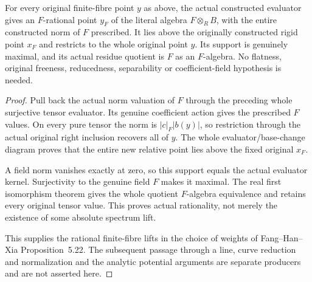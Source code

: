 \begin{theorem}
\label{spectrum:finite-rational-rigid-fibre-lift}
\leanok
{}
For every original finite-fibre point $y$ as above, the actual constructed
evaluator gives an $F$-rational point $y_F$ of the literal algebra
$F\otimes_RB$, with the entire constructed norm of $F$ prescribed.
It lies above the originally constructed rigid point $x_F$ and restricts
to the whole original point $y$. Its support is genuinely maximal, and
its actual residue quotient is $F$ as an $F$-algebra. No flatness, original
freeness, reducedness, separability or coefficient-field hypothesis is
needed.
\end{theorem}
\begin{proof}
Pull back the actual norm valuation of $F$ through the preceding whole
surjective tensor evaluator. Its genuine coefficient action gives the
prescribed $F$ values. On every pure tensor the norm is
$|c|_F|b(y)|$, so restriction through the actual original right inclusion
recovers all of $y$. The whole evaluator/base-change diagram proves
that the entire new relative point lies above the fixed original $x_F$.

A field norm vanishes exactly at zero, so this support equals the actual
evaluator kernel. Surjectivity to the genuine field $F$ makes it maximal.
The real first isomorphism theorem gives the whole quotient $F$-algebra
equivalence and retains every original tensor value. This proves actual
rationality, not merely the existence of some absolute spectrum lift.

This supplies the rational finite-fibre lifts in the choice of weights
of Fang--Han--Xia Proposition~5.22. The subsequent passage through a line,
curve reduction and normalization and the analytic potential arguments
are separate producers and are not asserted here.
\end{proof}
